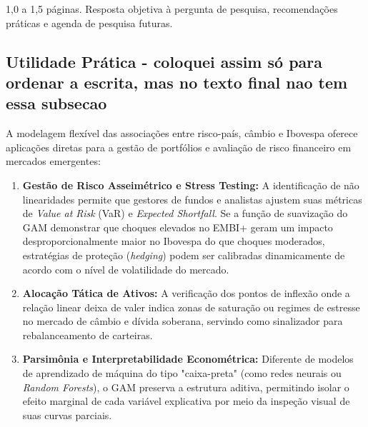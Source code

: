 \documentclass[11pt,a4paper]{article}
\begin{document}
1,0 a 1,5 páginas. Resposta objetiva à pergunta de pesquisa, recomendações práticas e agenda de pesquisa futuras.


\subsection{Utilidade Prática - coloquei assim só para ordenar a escrita, mas no texto final nao tem essa subsecao}
A modelagem flexível das associações entre risco-país, câmbio e Ibovespa oferece aplicações diretas para a gestão de portfólios e avaliação de risco financeiro em mercados emergentes:
\begin{enumerate}
    \item \textbf{Gestão de Risco Asseimétrico e Stress Testing:} A identificação de não linearidades permite que gestores de fundos e analistas ajustem suas métricas de \textit{Value at Risk} (VaR) e \textit{Expected Shortfall}. Se a função de suavização do GAM demonstrar que choques elevados no EMBI+ geram um impacto desproporcionalmente maior no Ibovespa do que choques moderados, estratégias de proteção (\textit{hedging}) podem ser calibradas dinamicamente de acordo com o nível de volatilidade do mercado.
    \item \textbf{Alocação Tática de Ativos:} A verificação dos pontos de inflexão onde a relação linear deixa de valer indica zonas de saturação ou regimes de estresse no mercado de câmbio e dívida soberana, servindo como sinalizador para rebalanceamento de carteiras.
    \item \textbf{Parsimônia e Interpretabilidade Econométrica:} Diferente de modelos de aprendizado de máquina do tipo "caixa-preta" (como redes neurais ou \textit{Random Forests}), o GAM preserva a estrutura aditiva, permitindo isolar o efeito marginal de cada variável explicativa por meio da inspeção visual de suas curvas parciais.
\end{enumerate}
\end{document}
